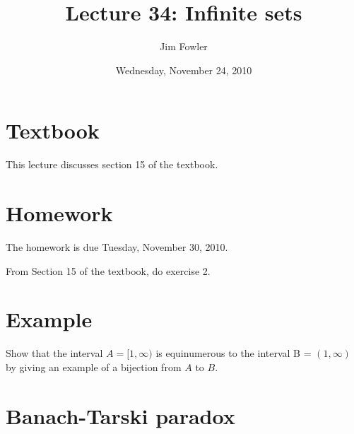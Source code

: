 \documentclass[12pt]{handout}
\title{Lecture 34: Infinite sets}
\author{Jim Fowler}
\date{Wednesday, November 24, 2010}
\begin{document}
\maketitle

\section*{Textbook}

This lecture discusses section 15 of the textbook.

\section*{Homework} 

The homework is due Tuesday, November 30, 2010.

From Section 15 of the textbook, do exercise 2.

\section*{Example}

Show that the interval $A = [1, \infty)$ is equinumerous to the
interval B = $(1, \infty)$ by giving an example of a bijection from
$A$ to $B$.

\section*{Banach-Tarski paradox}
\end{document}
